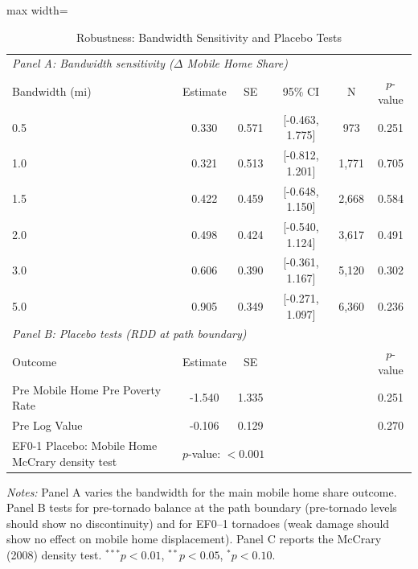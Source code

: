 \begin{table}[t]
\centering
\caption{Robustness: Bandwidth Sensitivity and Placebo Tests}
\label{tab:robustness}
\begin{adjustbox}{max width=\textwidth}
\begin{tabular}{lccccc}
\hline\hline
\multicolumn{6}{l}{\textit{Panel A: Bandwidth sensitivity ($\Delta$ Mobile Home Share)}} \\[3pt]
Bandwidth (mi) & Estimate & SE & 95\% CI & N & $p$-value \\
\hline
0.5 & 0.330 & 0.571 & [-0.463, 1.775] & 973 & 0.251 \\
1.0 & 0.321 & 0.513 & [-0.812, 1.201] & 1,771 & 0.705 \\
1.5 & 0.422 & 0.459 & [-0.648, 1.150] & 2,668 & 0.584 \\
2.0 & 0.498 & 0.424 & [-0.540, 1.124] & 3,617 & 0.491 \\
3.0 & 0.606 & 0.390 & [-0.361, 1.167] & 5,120 & 0.302 \\
5.0 & 0.905 & 0.349 & [-0.271, 1.097] & 6,360 & 0.236 \\
\hline
\multicolumn{6}{l}{\textit{Panel B: Placebo tests (RDD at path boundary)}} \\[3pt]
Outcome & Estimate & SE & & & $p$-value \\
\hline
Pre Mobile Home %
Pre Poverty Rate & -1.540 & 1.335 & & & 0.251 \\
Pre Log Value & -0.106 & 0.129 & & & 0.270 \\
EF0-1 Placebo: Mobile Home %
\hline
McCrary density test & \multicolumn{5}{l}{$p$-value: $< 0.001$} \\
\hline\hline
\end{tabular}
\end{adjustbox}

\vspace{0.3em}
\raggedright\footnotesize
\textit{Notes:} Panel A varies the bandwidth for the main mobile home share outcome. Panel B tests for pre-tornado balance at the path boundary (pre-tornado levels should show no discontinuity) and for EF0--1 tornadoes (weak damage should show no effect on mobile home displacement). Panel C reports the McCrary (2008) density test. $^{***}p<0.01$, $^{**}p<0.05$, $^{*}p<0.10$.
\end{table}
